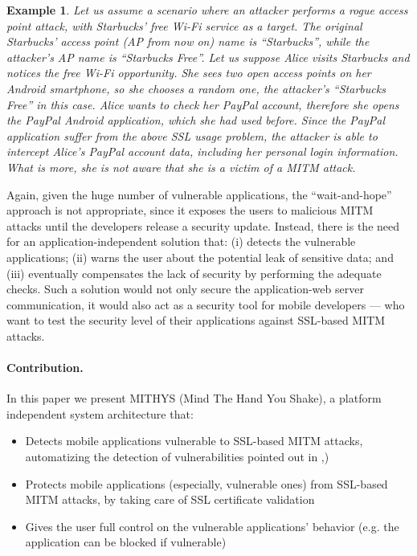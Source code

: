 \documentclass[english]{llncs}
\newtheorem{myexample}{Example}
\begin{document}
\begin{myexample}
\label{example_1}
Let us assume a scenario where an attacker performs a rogue access point attack, with Starbucks' free Wi-Fi service as a target. The original Starbucks' access point (AP from now on) name is ``Starbucks'', while the attacker's AP name is ``Starbucks Free''. Let us suppose Alice visits Starbucks and notices the free Wi-Fi opportunity. She sees two open access points on her Android smartphone, so she chooses a random one, the attacker's ``Starbucks Free'' in this case. Alice wants to check her PayPal account, therefore she opens the PayPal Android application, which she had used before. Since the PayPal application suffer from the above SSL usage problem, the attacker is able to intercept Alice's PayPal account data, including her personal login information. What is more, she is not aware that she is a victim of a MITM attack.
\end{myexample}

Again, given the huge number of vulnerable applications, the ``wait-and-hope'' approach is not appropriate, since it exposes the users to malicious MITM attacks until the developers release a security update. Instead, there is the need for an application-independent solution that: (i) detects the vulnerable applications; (ii) warns the user about the potential leak of sensitive data; and (iii) eventually compensates the lack of security by performing the adequate checks. Such a solution would not only secure the application-web server communication, it would also act as a security tool for mobile developers --- who want to test the security level of their applications against SSL-based MITM attacks.

\paragraph{Contribution.}
In this paper we present MITHYS (Mind The Hand You Shake), a platform independent system architecture that:
\begin{itemize}
	\item Detects mobile applications vulnerable to SSL-based MITM attacks, automatizing the detection of vulnerabilities pointed out in \cite{Fahl:2012:WEM:2382196.2382205},\cite{Georgiev:2012:MDC:2382196.2382204})
	\item Protects mobile applications (especially, vulnerable ones) from SSL-based MITM attacks, by taking care of SSL certificate validation 
	\item Gives the user full control on the vulnerable applications' behavior (e.g. the application can be blocked if vulnerable)
\end{itemize}
\end{document}
